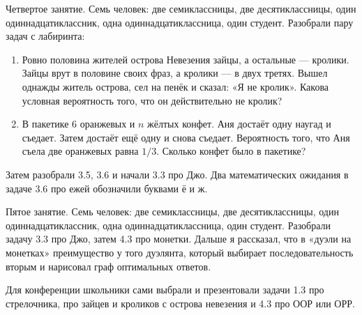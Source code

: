 \documentclass[12pt]{article}
\begin{document}
Четвертое занятие. Семь человек: две семиклассницы, две десятиклассницы, один одиннадцатиклассник, одна одиннадцатиклассница,
один студент. Разобрали пару задач с лабиринта: 
\begin{enumerate}
    \item  Ровно половина жителей острова Невезения зайцы, а остальные — кролики. 
    Зайцы врут в половине своих фраз, а кролики — в двух третях. 
    Вышел однажды житель острова, сел на пенёк и сказал: «Я не кролик». 
    Какова условная вероятность того, что он действительно не кролик?
    \item В пакетике 6 оранжевых и $n$ жёлтых конфет. Аня достаёт одну наугад и съедает. 
    Затем достаёт ещё одну и снова съедает. 
    Вероятность того, что Аня съела две оранжевых равна $1/3$. Сколько конфет было в пакетике?
\end{enumerate}
Затем разобрали 3.5, 3.6 и начали 3.3 про Джо. 
Два математических ожидания в задаче 3.6 про ежей обозначили буквами ё и ж. 

Пятое занятие. Семь человек: две семиклассницы, две десятиклассницы, один одиннадцатиклассник, одна одиннадцатиклассница,
один студент.
Разобрали задачу 3.3 про Джо, затем 4.3 про монетки. 
Дальше я рассказал, что в «дуэли на монетках» преимущество у того дуэлянта, который выбирает 
последовательность вторым и нарисовал граф оптимальных ответов. 

Для конференции школьники сами выбрали и презентовали задачи 1.3 про стрелочника, про зайцев и кроликов с острова невезения и 4.3 про ООР или ОРР.
    
\end{document}
